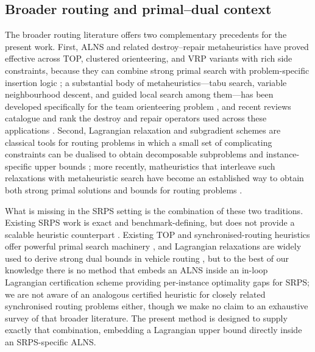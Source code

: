 \documentclass[preprint,12pt]{elsarticle}
\begin{document}
\subsection{Broader routing and primal--dual context}

The broader routing literature offers two complementary precedents for the present work. First, ALNS and related destroy--repair metaheuristics have proved effective across TOP, clustered orienteering, and VRP variants with rich side constraints, because they can combine strong primal search with problem-specific insertion logic \cite{RopkePisinger2006ALNS,PisingerRopke2007LNS,Vansteenwegen2011Orienteering,StochasticALNSPrizeCollecting}; a substantial body of metaheuristics---tabu search, variable neighbourhood descent, and guided local search among them---has been developed specifically for the team orienteering problem \cite{Archetti2007MetaheuristicsTOP,Tang2005TabuTOP,Bouly2010MemeticTOP,Vansteenwegen2009GLSTOP}, and recent reviews catalogue and rank the destroy and repair operators used across these applications \cite{ALNSOperatorReview}. Second, Lagrangian relaxation and subgradient schemes are classical tools for routing problems in which a small set of complicating constraints can be dualised to obtain decomposable subproblems and instance-specific upper bounds \cite{Fisher1981Lagrangian,Guignard2003Lagrangean,Held1974Subgradient,KohlMadsen1997VRPTW,Kohl1999LagrangeVRPTW}; more recently, matheuristics that interleave such relaxations with metaheuristic search have become an established way to obtain both strong primal solutions and bounds for routing problems \cite{ArchettiSperanza2014Matheuristic}.

What is missing in the SRPS setting is the combination of these two traditions.
Existing SRPS work is exact and benchmark-defining, but does not provide a scalable
heuristic counterpart \cite{RieraLedesma2021SRPS}. Existing TOP and
synchronised-routing heuristics offer powerful primal search machinery
\cite{RopkePisinger2006ALNS,Vansteenwegen2011Orienteering,Drexl2012SurveySync,Afifi2016COPTW},
and Lagrangian relaxations are widely used to derive strong dual bounds in vehicle
routing \cite{KohlMadsen1997VRPTW,Kohl1999LagrangeVRPTW}, but to the best of our
knowledge there is no method that embeds an ALNS inside an in-loop Lagrangian
certification scheme providing per-instance optimality gaps for SRPS; we are not aware
of an analogous certified heuristic for closely related synchronised routing problems
either, though we make no claim to an exhaustive survey of that broader literature.
The present method is designed to supply exactly
that combination, embedding a Lagrangian upper bound directly inside an
SRPS-specific ALNS.
\end{document}
